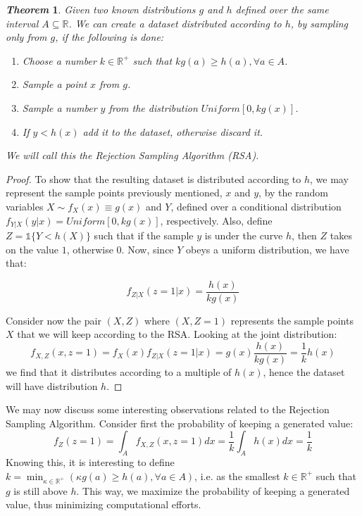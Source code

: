 \documentclass[11pt,onecolumn]{article}
\newtheorem{theorem}{\textit{Theorem}}
\begin{document}
\begin{theorem}
Given two known distributions $g$ and $h$ defined over the same interval $A\subseteq\mathbb{R}$. We can create a dataset distributed according to $h$, by sampling only from $g$, if the following is done:

\begin{enumerate}
	\item Choose a number $k\in\mathbb{R^+}$ such that $kg(a)\geq h(a),\forall a\in A$.
	\item Sample a point $x$ from $g$.
	\item Sample a number $y$ from the distribution $Uniform[0,kg(x)]$.
	\item If $y<h(x)$ add it to the dataset, otherwise discard it.
\end{enumerate}
We will call this the \textit{Rejection Sampling Algorithm (RSA)}.
\end{theorem}

\begin{proof}
To show that the resulting dataset is distributed according to $h$, we may represent the sample points previously mentioned, $x$ and $y$, by the random variables $X \sim f_X(x)\equiv g(x)$ and $Y$, defined over a conditional distribution $f_{Y|X}(y|x)=Uniform[0,kg(x)]$, respectively. Also, define $Z=\mathbb{1}\{Y<h(X)\}$ such that if the sample $y$ is under the curve $h$, then $Z$ takes on the value $1$, otherwise $0$. Now, since $Y$ obeys a uniform distribution, we have that:

$$f_{Z|X}(z=1|x)=\frac{h(x)}{kg(x)}$$

Consider now the pair $(X,Z)$ where $(X,Z=1)$ represents the sample points $X$ that we will keep according to the RSA. Looking at the joint distribution: 
$$f_{X,Z}(x,z=1)=f_X(x)f_{Z|X}(z=1|x)=g(x)\frac{h(x)}{kg(x)}=\frac{1}{k}h(x)$$ 
we find that it distributes according to a multiple of $h(x)$, hence the dataset will have distribution $h$. 
\end{proof}

We may now discuss some interesting observations related to the Rejection Sampling Algorithm. Consider first the probability of keeping a generated value: $$f_Z(z=1)=\int_A f_{X,Z}(x,z=1)dx=\frac{1}{k}\int_A h(x)dx=\frac{1}{k}$$
Knowing this, it is interesting to define $k=\min_{\kappa\in\mathbb{R^+}}(\kappa g(a)\geq h(a), \forall a\in A)$, i.e. as the smallest $k\in\mathbb{R^+}$ such that $g$ is still above $h$. This way, we maximize the probability of keeping a generated value, thus minimizing computational efforts.\\
\end{document}
